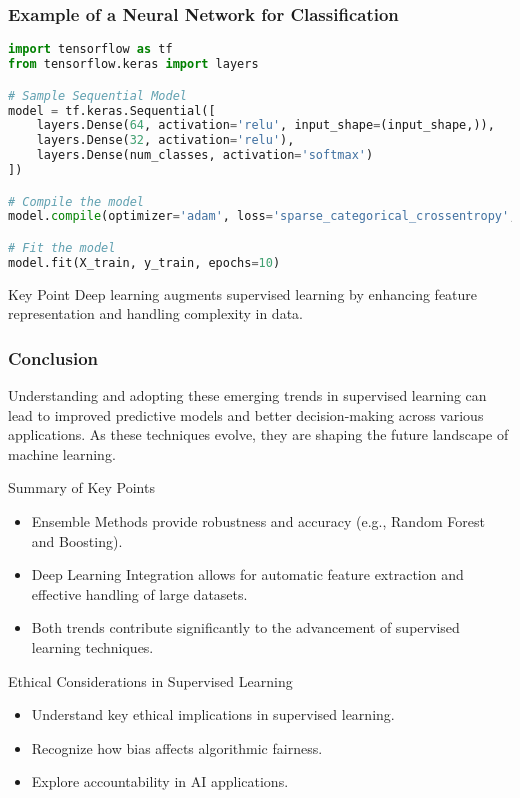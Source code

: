 \documentclass[aspectratio=169]{beamer}
\begin{document}
\begin{frame}[fragile]
    \frametitle{Example of a Neural Network for Classification}
    \begin{lstlisting}[language=Python]
import tensorflow as tf
from tensorflow.keras import layers

# Sample Sequential Model
model = tf.keras.Sequential([
    layers.Dense(64, activation='relu', input_shape=(input_shape,)),
    layers.Dense(32, activation='relu'),
    layers.Dense(num_classes, activation='softmax')
])

# Compile the model
model.compile(optimizer='adam', loss='sparse_categorical_crossentropy', metrics=['accuracy'])

# Fit the model
model.fit(X_train, y_train, epochs=10)
    \end{lstlisting}

    \begin{block}{Key Point}
        Deep learning augments supervised learning by enhancing feature representation and handling complexity in data.
    \end{block}
\end{frame}

\begin{frame}
    \frametitle{Conclusion}
    Understanding and adopting these emerging trends in supervised learning can lead to improved predictive models and better decision-making across various applications. 
    As these techniques evolve, they are shaping the future landscape of machine learning.
    
    \begin{block}{Summary of Key Points}
        \begin{itemize}
            \item Ensemble Methods provide robustness and accuracy (e.g., Random Forest and Boosting).
            \item Deep Learning Integration allows for automatic feature extraction and effective handling of large datasets.
            \item Both trends contribute significantly to the advancement of supervised learning techniques.
        \end{itemize}
    \end{block}
\end{frame}

\begin{frame}[fragile]{Ethical Considerations in Supervised Learning}
    \begin{itemize}
        \item Understand key ethical implications in supervised learning.
        \item Recognize how bias affects algorithmic fairness.
        \item Explore accountability in AI applications.
    \end{itemize}
\end{frame}
\end{document}
